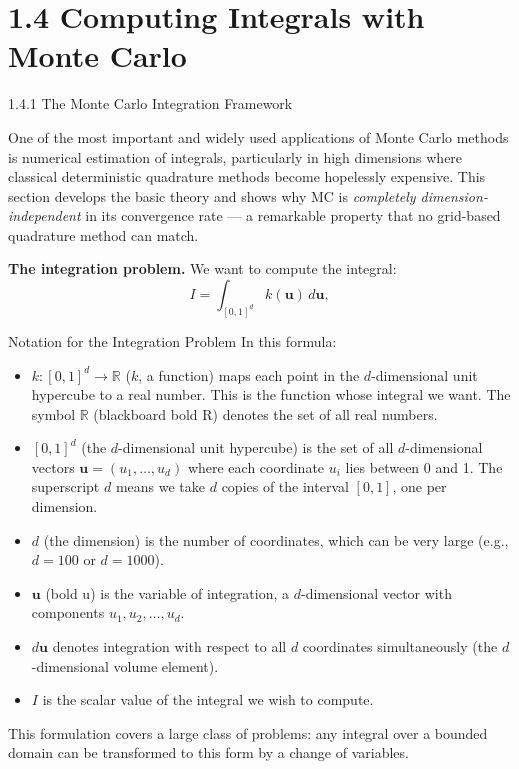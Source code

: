 \documentclass[aspectratio=169,10pt]{beamer}
\begin{document}
\section{1.4 Computing Integrals with Monte Carlo}

\begin{frame}[allowframebreaks]{1.4.1 The Monte Carlo Integration Framework}

  One of the most important and widely used applications of Monte Carlo methods
  is numerical estimation of integrals, particularly in high dimensions where
  classical deterministic quadrature methods become hopelessly expensive.  This
  section develops the basic theory and shows why MC is \emph{completely
  dimension-independent} in its convergence rate --- a remarkable property that
  no grid-based quadrature method can match.

  \textbf{The integration problem.}  We want to compute the integral:
  \[
    I = \int_{[0,1]^d} k(\mathbf{u})\, d\mathbf{u},
  \]

  \begin{block}{Notation for the Integration Problem}
    In this formula:
    \begin{itemize}
      \item $k : [0,1]^d \to \mathbb{R}$ ($k$, a function) maps each point in
        the $d$-dimensional unit hypercube to a real number.  This is the
        function whose integral we want.  The symbol $\mathbb{R}$ (blackboard
        bold R) denotes the set of all real numbers.
      \item $[0,1]^d$ (the $d$-dimensional unit hypercube) is the set of all
        $d$-dimensional vectors $\mathbf{u} = (u_1, \ldots, u_d)$ where each
        coordinate $u_i$ lies between 0 and 1.  The superscript $d$ means we
        take $d$ copies of the interval $[0,1]$, one per dimension.
      \item $d$ (the dimension) is the number of coordinates, which can be
        very large (e.g., $d = 100$ or $d = 1000$).
      \item $\mathbf{u}$ (bold u) is the variable of integration, a
        $d$-dimensional vector with components $u_1, u_2, \ldots, u_d$.
      \item $d\mathbf{u}$ denotes integration with respect to all $d$
        coordinates simultaneously (the $d$-dimensional volume element).
      \item $I$ is the scalar value of the integral we wish to compute.
    \end{itemize}
    This formulation covers a large class of problems: any integral over a
    bounded domain can be transformed to this form by a change of variables.
  \end{block}


\end{frame}
\end{document}
